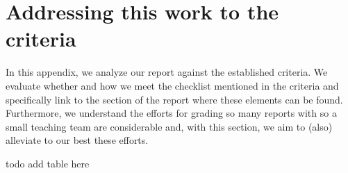 
\appendix

\section{Addressing this work to the criteria}
In this appendix, we analyze our report against the established criteria. We evaluate whether and how we meet the checklist mentioned in the criteria and specifically link to the section of the report where these elements can be found. Furthermore, we understand the efforts for grading so many reports with so a small teaching team are considerable and, with this section, we aim to (also) alleviate to our best these efforts.

todo add table here